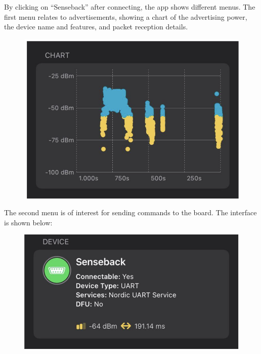 \documentclass{Configuration_Files/PoliMi3i_thesis}
\begin{document}
By clicking on “Senseback” after connecting, the app shows different menus. The first menu relates to advertisements, showing a chart of the advertising power, the device name and features, and packet reception details.

\begin{figure}[H]
    \centering
    \includegraphics[scale=0.3]{Multicentral/8.png}
    \label{fig:nrf_connect_advertisements}
\end{figure}

The second menu is of interest for sending commands to the board. The interface is shown below:

\begin{figure}[H]
    \centering
    \includegraphics[scale=0.3]{Multicentral/9.png}
    \label{fig:nrf_connect_commands}
\end{figure}
\end{document}
